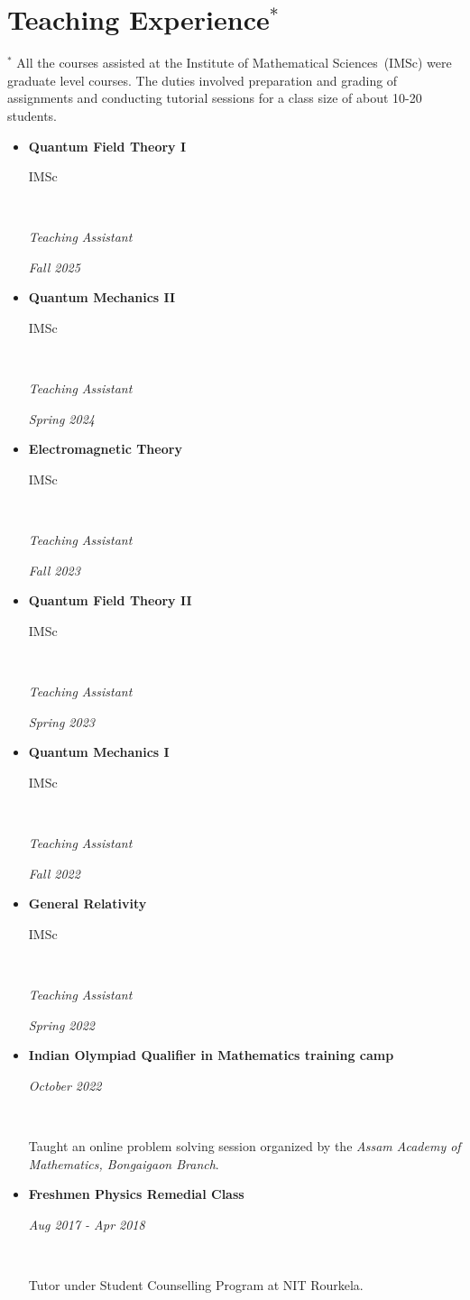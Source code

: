\documentclass[11pt, letterpaper]{article}
\newcommand{\entry}[4]{
	\ifthenelse{\isempty{#3}}
	{\slimentry{#1}{#2}}{
		\begin{minipage}[t]{.25\linewidth}
			\hfill #1
		\end{minipage}
		\hfill \vline \hfill
		\begin{minipage}[t]{.7\linewidth}
			{\bf #2} \\ #3 \\ \footnotesize{#4}
		\end{minipage}\\
		\vspace{.2cm}
}}
\newcommand{\slimentry}[2]{
	\begin{minipage}[t]{.25\linewidth}
		\hfill \textsc{#1}
	\end{minipage}
	\hfill \vline \hfill
	\begin{minipage}[t]{.7\linewidth}
		#2
	\end{minipage}\\
	\vspace{.25cm}
}%
\newcommand{\colentry}[2]{
	\begin{minipage}[t]{.75\linewidth}
		#1
	\end{minipage}
	\hfill
	\begin{minipage}[t]{.22\linewidth}
		\hfill #2
	\end{minipage}
}%
\newcommand{\imsc}{Institute of Mathematical Sciences}
\begin{document}
	\section{Teaching Experience\texorpdfstring{$^*$}{}}
	$^*$ All the courses assisted at the \imsc\ (IMSc) were graduate level courses. The duties involved preparation and grading of assignments and conducting tutorial sessions for a class size of about 10-20 students.
	
	\begin{itemize}
		\item \colentry{\textbf{Quantum Field Theory I}}{IMSc} \\ \colentry{\textit{Teaching Assistant}}{\textit{Fall 2025}}
		
		\item \colentry{\textbf{Quantum Mechanics II}}{IMSc} \\ \colentry{\textit{Teaching Assistant}}{\textit{Spring 2024}}
		
		\item \colentry{\textbf{Electromagnetic Theory}}{IMSc} \\ \colentry{\textit{Teaching Assistant}}{\textit{Fall 2023}}
		
		\item \colentry{\textbf{Quantum Field Theory II}}{IMSc} \\ \colentry{\textit{Teaching Assistant}}{\textit{Spring 2023}}
		
		\item \colentry{\textbf{Quantum Mechanics I}}{IMSc} \\ \colentry{\textit{Teaching Assistant}}{\textit{Fall 2022}}
		
		\item \colentry{\textbf{General Relativity}}{IMSc} \\ \colentry{\textit{Teaching Assistant}}{\textit{Spring 2022}}
		
		\item \colentry{\textbf{Indian Olympiad Qualifier in Mathematics training camp}}{\textit{October 2022}} \\ \colentry{Taught an online problem solving session organized by the \textit{Assam Academy of Mathematics, Bongaigaon Branch}.}{}
		
		\item \colentry{\textbf{Freshmen Physics Remedial Class}}{\textit{Aug 2017 - Apr 2018}} \\ \colentry{Tutor under Student Counselling Program at NIT Rourkela.}{}
	\end{itemize}
	
\end{document}
